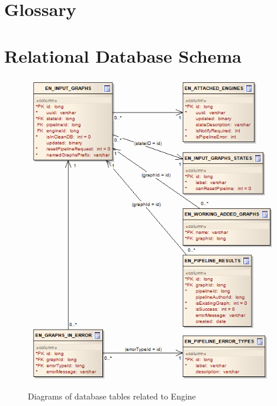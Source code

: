
\appendix

\chapter{Glossary}
\label{chap:glossary}



\chapter{Relational Database Schema}
\label{chap:reldb}

\begin{figure}[htbp]
    \centering
    \includegraphics[scale=0.6]{images/db-engine.png}
    \caption{Diagrams of database tables related to Engine}
	\label{fig:dbEngine}
\end{figure}

